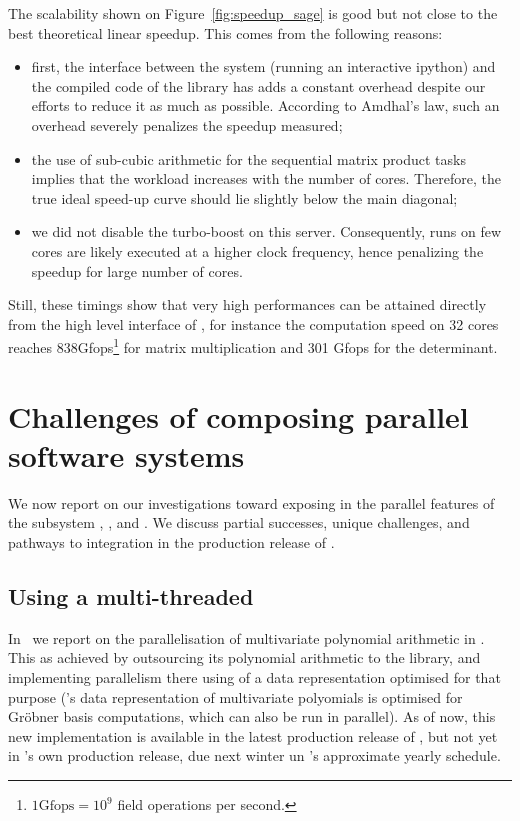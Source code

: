 \documentclass{deliverablereport}
\begin{document}
The scalability shown on Figure~\ref{fig:speedup_sage} is good but not close to the best theoretical linear
speedup. This comes from the following reasons:
\begin{itemize}
\item first, the interface between the system \SageMath (running an interactive ipython) and the compiled code of the
  library has adds a constant overhead despite our efforts to reduce it as much as possible. According to Amdhal's law,
  such an overhead severely penalizes the speedup measured;
\item the use of sub-cubic arithmetic for the sequential matrix product tasks implies that the workload increases with
  the number of cores. Therefore, the true ideal speed-up curve should lie slightly below the main diagonal;
\item we did not disable the turbo-boost on this server. Consequently, runs on few cores are likely executed at a higher
  clock frequency, hence penalizing the speedup for large number of cores.
\end{itemize}

Still, these timings show that very high performances can be attained directly from the high level interface of
\SageMath, for instance the computation speed on 32 cores reaches 838Gfops\footnote{$1\text{Gfops} = 10^9$ field
  operations per second.} for matrix multiplication and 301 Gfops for
the determinant.

\section{Challenges of composing parallel software systems}

We now report on our investigations toward exposing in \SageMath the
parallel features of the subsystem \Singular, \GAP, and \Pari. We
discuss partial successes, unique challenges, and pathways to
integration in the production release of \SageMath.

\subsection{Using a multi-threaded \Singular}

In~\delivref{}{} we report on the parallelisation of multivariate
polynomial arithmetic in \Singular. This as achieved by outsourcing
its polynomial arithmetic to the \FLINT library, and implementing
parallelism there using of a data representation optimised for that
purpose (\Singular's data representation of multivariate polyomials is
optimised for Gr\"{o}bner basis computations, which can also be run in
parallel). As of now, this new implementation is available in the
latest production release of \FLINT, but not yet in \Singular's own
production release, due next winter un \Singular's approximate yearly
schedule.
\end{document}
